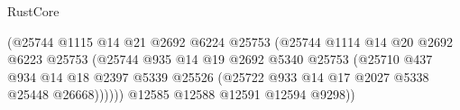 \begin{lexlean}{RustCore}
\begin{coremodule}
                                                    (@25744
                                                      @1115
                                                      @14
                                                      @21
                                                      @2692
                                                      @6224
                                                      @25753
                                                      (@25744
                                                        @1114
                                                        @14
                                                        @20
                                                        @2692
                                                        @6223
                                                        @25753
                                                        (@25744
                                                          @935
                                                          @14
                                                          @19
                                                          @2692
                                                          @5340
                                                          @25753
                                                          (@25710
                                                            @437
                                                            @934
                                                            @14
                                                            @18
                                                            @2397
                                                            @5339
                                                            @25526
                                                            (@25722
                                                              @933
                                                              @14
                                                              @17
                                                              @2027
                                                              @5338
                                                              @25448
                                                              @26668))))))
                                                  @12585
                                                  @12588
                                                  @12591
                                                  @12594
                                                  @9298))

\end{coremodule}
\end{lexlean}
